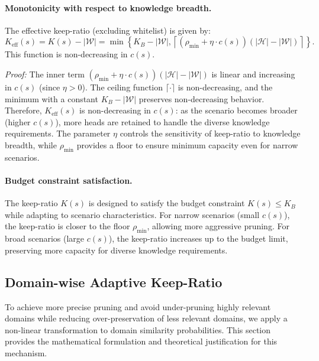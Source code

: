 \paragraph{Monotonicity with respect to knowledge breadth.}
The effective keep-ratio (excluding whitelist) is given by:
\begin{equation}
K_{\mathrm{eff}}(s) = K(s) - |\mathcal{W}| = \min\left\{ K_B - |\mathcal{W}|, \left\lceil(\rho_{\min} + \eta \cdot c(s))(|\mathcal{H}| - |\mathcal{W}|)\right\rceil \right\}.
\end{equation}
This function is non-decreasing in $c(s)$.

\emph{Proof:} The inner term $(\rho_{\min} + \eta \cdot c(s))(|\mathcal{H}| - |\mathcal{W}|)$ is linear and increasing in $c(s)$ (since $\eta > 0$).
The ceiling function $\lceil \cdot \rceil$ is non-decreasing, and the minimum with a constant $K_B - |\mathcal{W}|$ preserves non-decreasing behavior.
Therefore, $K_{\mathrm{eff}}(s)$ is non-decreasing in $c(s)$: as the scenario becomes broader (higher $c(s)$), more heads are retained to handle the diverse knowledge requirements.
The parameter $\eta$ controls the sensitivity of keep-ratio to knowledge breadth, while $\rho_{\min}$ provides a floor to ensure minimum capacity even for narrow scenarios.

\paragraph{Budget constraint satisfaction.}
The keep-ratio $K(s)$ is designed to satisfy the budget constraint $K(s) \leq K_B$ while adapting to scenario characteristics.
For narrow scenarios (small $c(s)$), the keep-ratio is closer to the floor $\rho_{\min}$, allowing more aggressive pruning.
For broad scenarios (large $c(s)$), the keep-ratio increases up to the budget limit, preserving more capacity for diverse knowledge requirements.

\subsection{Domain-wise Adaptive Keep-Ratio}
\label{app:math_domain_keep_ratio}

To achieve more precise pruning and avoid under-pruning highly relevant domains while reducing over-preservation of less relevant domains, we apply a non-linear transformation to domain similarity probabilities.
This section provides the mathematical formulation and theoretical justification for this mechanism.

